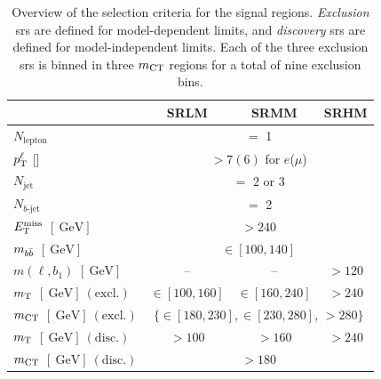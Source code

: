 \begin{table}
	\begin{center}
		\begin{tabular} {l | c c c }
			\toprule
				&  \textbf{SRLM} & \textbf{SRMM} & \textbf{SRHM} \\
			\midrule
			$N_{\mathrm{lepton}}$ & \multicolumn{3}{c}{$=$ 1}\\
			$p^\ell_{\textrm{T}}$ [\GeV] & \multicolumn{3}{c}{ $>7(6)$ for $e$($\mu$)} \\
			$N_\mathrm{jet}$ & \multicolumn{3}{c}{$=$ 2 or 3}\\
			$N_{b\textrm{-jet}}$ &\multicolumn{3}{c}{$=$ 2} \\
			$E_{\textrm{T}}^{\textrm{miss}}$ $[\SI{}{\GeV}]$ & \multicolumn{3}{c}{$>240$}\\
			$m_{b\bar{b}}$  $[\SI{}{\GeV}]$ & \multicolumn{3}{c}{$\in [100,140]$}\\
			$m(\ell,b_1)$ $[\SI{}{\GeV}]$ & -- & -- & $>120$ \\
			\midrule
			$m_{\textrm{T}}$ $[\SI{}{\GeV}]~\mathrm{(excl.)}$&   $\in [100,160]$ & $\in [160,240]$ & $>240$ \\
			
			
			$m_{\textrm{CT}}$ $[\SI{}{\GeV}]~\mathrm{(excl.)}$ &\multicolumn{3}{c}{ $ \{ \in [180,230]$,\,$\in [230,280]$, $>280  \}$}\\
			
			\midrule
			$m_{\textrm{T}}$ $[\SI{}{\GeV}]~\mathrm{(disc.)}$&   $>100$ & $>160$ & $>240$ \\
			$m_{\textrm{CT}}$ $[\SI{}{\GeV}]~\mathrm{(disc.)}$ & \multicolumn{3}{c}{ $>180$}\\
			\bottomrule
		\end{tabular}
		\caption{Overview of the selection criteria for the signal regions. \textit{Exclusion} \glspl{sr} are defined for model-dependent limits, and \textit{discovery} \glspl{sr} are defined for model-independent limits. Each of the three exclusion \glspl{sr} is binned in three $m_{\textrm{CT}}$ regions for a total of nine exclusion bins.} 
		\label{tab:SignalRegionDef}
	\end{center}
\end{table}

